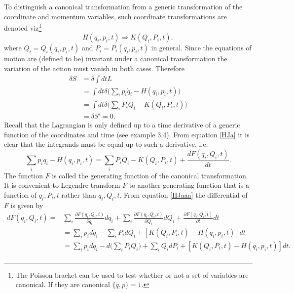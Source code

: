 To distinguish a canonical transformation from a generic transformation of the coordinate and momentum variables, such coordinate transformations are denoted viz\footnote{The Poisson bracket can be used to test whether or not a set of variables are canonical. If they are canonical $\{q,p\}=1$.}
\begin{equation}
	H(q_i,p_i,t)\Rightarrow K(Q_i,P_i,t),
\end{equation} 
where $Q_i=Q_i(q_i,p_i,t)$ and $P_i=P_i(q_i,p_i,t)$ in general. Since the equations of motion are (defined to be) invariant under a canonical transformation the variation of the action must vanish in both cases. Therefore
\begin{equation}
	\begin{split}
		\delta S&= \delta\int dt  L\\
		&= \int dt \delta\bigg(\sum_ip_i\dot{q}_i-H(q_i,p_i,t)\bigg)\\
		&= \int dt \delta\bigg(\sum_iP_i\dot{Q}_i-K(Q_i,P_i,t)\bigg)\\
		&=\delta S'=0.
	\end{split}
	\label{HJa}
\end{equation} 
Recall that the Lagrangian is only defined up to a time derivative of a generic function of the coordinates and time (see example 3.4). From equation \eqref{HJa} it is clear that the integrands must be equal up to such a derivative, i.e.
\begin{equation}
	\sum_ip_i\dot{q}_i-H(q_i,p_i,t)=\sum_iP_i\dot{Q}_i-K(Q_i,P_i,t)+\frac{dF(q_i,Q_i,t)}{dt}.
	\label{HJaaa}
\end{equation} 
The function $F$ is called the generating function of the canonical transformation. It is convenient to Legendre transform $F$ to another generating function that is a function of $q_i,P_i,t$ rather than $q_i,Q_i,t$. From equation \eqref{HJaaa} the differential of $F$ is given by
\begin{equation}
	\begin{split}
		dF(q_i,Q_i,t)=&\sum_i\frac{\partial F(q_i,Q_i,t)}{\partial q_i}dq_i+\sum_i\frac{\partial F(q_i,Q_i,t)}{\partial Q_i}dQ_i+\frac{\partial F(q_i,Q_i,t)}{\partial t}dt\\
		&=\sum_ip_idq_i-\sum_iP_idQ_i+[K(Q_i,P_i,t)-H(q_i,p_i,t)]dt\\
		&=\sum_ip_idq_i-d\bigg(\sum_iP_iQ_i\bigg)+\sum_iQ_idP_i+[K(Q_i,P_i,t)-H(q_i,p_i,t)]dt.\\
	\end{split}
\end{equation}\normalsize
